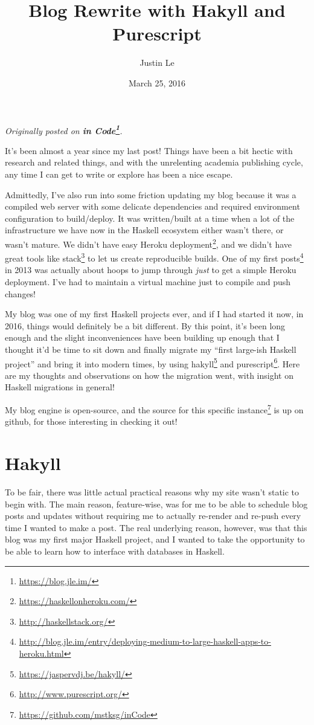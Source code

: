 \documentclass[]{article}
\title{Blog Rewrite with Hakyll and Purescript}
\author{Justin Le}
\date{March 25, 2016}
\renewcommand{\href}[2]{#2\footnote{\url{#1}}}
\begin{document}
\maketitle

\emph{Originally posted on \textbf{\href{https://blog.jle.im/}{in
Code}}.}

It's been almost a year since my last post! Things have been a bit
hectic with research and related things, and with the unrelenting
academia publishing cycle, any time I can get to write or explore has
been a nice escape.

Admittedly, I've also run into some friction updating my blog because it
was a compiled web server with some delicate dependencies and required
environment configuration to build/deploy. It was written/built at a
time when a lot of the infrastructure we have now in the Haskell
ecosystem either wasn't there, or wasn't mature. We didn't have easy
\href{https://haskellonheroku.com/}{Heroku deployment}, and we didn't
have great tools like \href{http://haskellstack.org/}{stack} to let us
create reproducible builds. One of my
\href{http://blog.jle.im/entry/deploying-medium-to-large-haskell-apps-to-heroku.html}{first
posts} in 2013 was actually about hoops to jump through \emph{just} to
get a simple Heroku deployment. I've had to maintain a virtual machine
just to compile and push changes!

My blog was one of my first Haskell projects ever, and if I had started
it now, in 2016, things would definitely be a bit different. By this
point, it's been long enough and the slight inconveniences have been
building up enough that I thought it'd be time to sit down and finally
migrate my ``first large-ish Haskell project'' and bring it into modern
times, by using \href{https://jaspervdj.be/hakyll/}{hakyll} and
\href{http://www.purescript.org/}{purescript}. Here are my thoughts and
observations on how the migration went, with insight on Haskell
migrations in general!

My blog engine is open-source, and the
\href{https://github.com/mstksg/inCode}{source for this specific
instance} is up on github, for those interesting in checking it out!

\section{Hakyll}\label{hakyll}

To be fair, there was little actual practical reasons why my site wasn't
static to begin with. The main reason, feature-wise, was for me to be
able to schedule blog posts and updates without requiring me to actually
re-render and re-push every time I wanted to make a post. The real
underlying reason, however, was that this blog was my first major
Haskell project, and I wanted to take the opportunity to be able to
learn how to interface with databases in Haskell.
\end{document}

